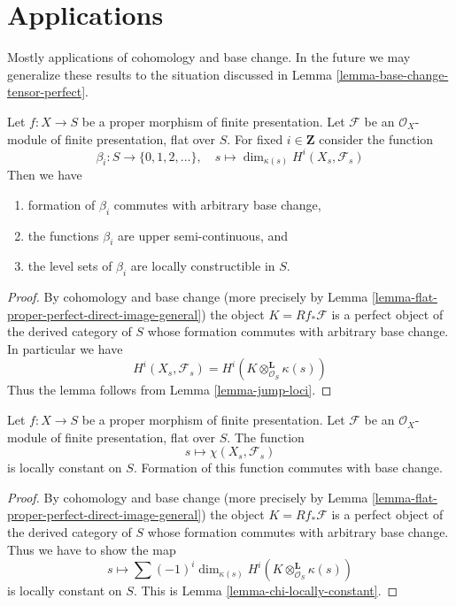 \section{Applications}
\label{section-applications}

\noindent
Mostly applications of cohomology and base change. In the future we may
generalize these results to the situation discussed in
Lemma \ref{lemma-base-change-tensor-perfect}.

\begin{lemma}
\label{lemma-jump-loci-geometric}
Let $f : X \to S$ be a proper morphism of finite presentation.
Let $\mathcal{F}$ be an $\mathcal{O}_X$-module of finite presentation,
flat over $S$. For fixed $i \in \mathbf{Z}$ consider the function
$$
\beta_i : S \to \{0, 1, 2, \ldots\},\quad
s \longmapsto \dim_{\kappa(s)} H^i(X_s, \mathcal{F}_s)
$$
Then we have
\begin{enumerate}
\item formation of $\beta_i$ commutes with arbitrary base change,
\item the functions $\beta_i$ are upper semi-continuous, and
\item the level sets of $\beta_i$ are locally constructible in $S$.
\end{enumerate}
\end{lemma}

\begin{proof}
By cohomology and base change (more precisely by
Lemma \ref{lemma-flat-proper-perfect-direct-image-general})
the object $K = Rf_*\mathcal{F}$ is a perfect object of the derived
category of $S$ whose formation commutes with arbitrary base change.
In particular we have
$$
H^i(X_s, \mathcal{F}_s) = H^i(K \otimes_{\mathcal{O}_S}^\mathbf{L} \kappa(s))
$$
Thus the lemma follows from
Lemma \ref{lemma-jump-loci}.
\end{proof}

\begin{lemma}
\label{lemma-chi-locally-constant-geometric}
Let $f : X \to S$ be a proper morphism of finite presentation.
Let $\mathcal{F}$ be an $\mathcal{O}_X$-module of finite presentation,
flat over $S$. The function
$$
s \longmapsto \chi(X_s, \mathcal{F}_s)
$$
is locally constant on $S$. Formation of this function commutes with
base change.
\end{lemma}

\begin{proof}
By cohomology and base change (more precisely by
Lemma \ref{lemma-flat-proper-perfect-direct-image-general})
the object $K = Rf_*\mathcal{F}$ is a perfect object of the derived
category of $S$ whose formation commutes with arbitrary base change.
Thus we have to show the map
$$
s \longmapsto \sum (-1)^i \dim_{\kappa(s)}
H^i(K \otimes^\mathbf{L}_{\mathcal{O}_S} \kappa(s))
$$
is locally constant on $S$. This is Lemma \ref{lemma-chi-locally-constant}.
\end{proof}

